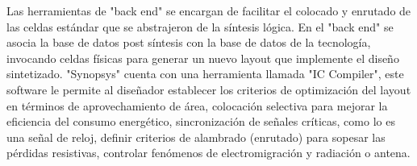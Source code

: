 Las herramientas de "back end" se encargan de facilitar el colocado y enrutado de las celdas estándar que se abstrajeron de la síntesis lógica. En el "back end" se asocia la base de datos post síntesis con la base de datos de la tecnología, invocando celdas físicas para generar un nuevo layout que implemente el diseño sintetizado. "Synopsys" cuenta con una herramienta llamada "IC Compiler", este software le permite al diseñador establecer los criterios de optimización del layout en términos de aprovechamiento de área, colocación selectiva para mejorar la eficiencia del consumo energético, sincronización de señales críticas, como lo es una señal de reloj, definir criterios de alambrado (enrutado) para sopesar las pérdidas resistivas, controlar fenómenos de electromigración y radiación o antena.




